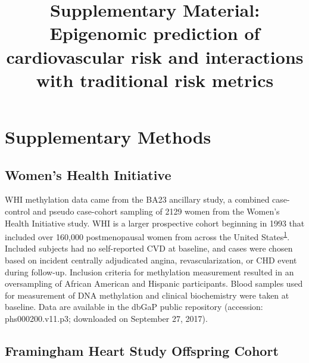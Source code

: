 \documentclass[]{article}
\title{Supplementary Material: Epigenomic prediction of cardiovascular risk and
interactions with traditional risk metrics}
\author{}
\date{}
\begin{document}
\maketitle

\newcommand{\beginsupplement}{
  \setcounter{table}{0}  
  \renewcommand{\thetable}{S\arabic{table}}
  \setcounter{figure}{0} 
  \renewcommand{\thefigure}{S\arabic{figure}}
}

\setcounter{table}{0}  
  \renewcommand{\thetable}{S\arabic{table}}
  \setcounter{figure}{0} 
  \renewcommand{\thefigure}{S\arabic{figure}}

\hypertarget{supplementary-methods}{%
\section{Supplementary Methods}\label{supplementary-methods}}

\hypertarget{womens-health-initiative}{%
\subsection{Women's Health Initiative}\label{womens-health-initiative}}

WHI methylation data came from the BA23 ancillary study, a combined
case-control and pseudo case-cohort sampling of 2129 women from the
Women's Health Initiative study. WHI is a larger prospective cohort
beginning in 1993 that included over 160,000 postmenopausal women from
across the United
States\textsuperscript{\protect\hyperlink{ref-Anderson1998}{1}}.
Included subjects had no self-reported CVD at baseline, and cases were
chosen based on incident centrally adjudicated angina,
revascularization, or CHD event during follow-up. Inclusion criteria for
methylation measurement resulted in an oversampling of African American
and Hispanic participants. Blood samples used for measurement of DNA
methylation and clinical biochemistry were taken at baseline. Data are
available in the dbGaP public repository (accession: phs000200.v11.p3;
downloaded on September 27, 2017).

\hypertarget{framingham-heart-study-offspring-cohort}{%
\subsection{Framingham Heart Study Offspring
Cohort}\label{framingham-heart-study-offspring-cohort}}
\end{document}
